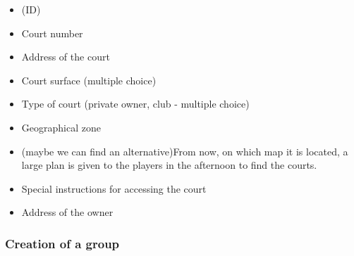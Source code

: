 \begin{itemize}
    \item (ID)
    \item Court number
    \item Address of the court
    \item Court surface (multiple choice)
    \item Type of court (private owner, club - multiple choice)
    \item Geographical zone
    \item (maybe we can find an alternative)From now, on which map it is
        located, a large plan is given to the players in the afternoon
        to find the courts.
    \item Special instructions for accessing the court
    \item Address of the owner
\end{itemize}



\subsubsection{Creation of a group}
